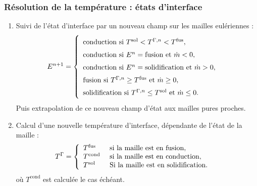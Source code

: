 \documentclass{beamer}
\newcommand{\inte}{\Gamma}
\newcommand{\fus}{\text{fus}}
\newcommand{\sol}{\text{sol}}
\newcommand{\cond}{\text{cond}}
\newcommand{\npl}{{n+1}}
\begin{document}
\begin{frame}
    \frametitle{Résolution de la température : états d'interface}
   	\footnotesize
\begin{enumerate}
	\item Suivi de l'état d'interface par un nouveau champ sur les mailles eulériennes :
\begin{align}
\label{eq:etatn2}
E^\npl &=\left\{ {\renewcommand{\arraystretch}{1.5}\begin{array}{l} 
\text{conduction} \text{ si } T^\sol < T^{\Gamma,n} <T^\fus,\\
\text{conduction} \text{ si } E^n = \text{fusion} \text{ et } \dot{m}<0,\\
\text{conduction} \text{ si } E^n = \text{solidification} \text{ et } \dot{m}>0,\\
\text{fusion} \text{ si } T^{\Gamma,n} \geq T^\fus \text{ et } \dot{m} \geq 0,\\
\text{solidification} \text{ si } T^{\Gamma,n} \leq T^\sol \text{ et } \dot{m} \leq 0.
 \end{array}}\right.
\end{align}
Puis extrapolation de ce nouveau champ d'état aux mailles pures proches.
\item Calcul d'une nouvelle température d'interface, dépendante de l'état de la maille :
\begin{align}
	T^{\inte} &= \left\{ {\renewcommand{\arraystretch}{1.}\begin{array}{l l l} 
		T^\fus & \text{ si la maille est en fusion},\\
		T^{\text{cond}} & \text{  si la maille  est en  conduction},\\
		T^\sol & \text{ Si la maille est en solidification}.
 \end{array}}\right.
\end{align} 
où $T^{\cond}$ est calculée le cas échéant.




\end{enumerate}
\end{frame}
\end{document}
